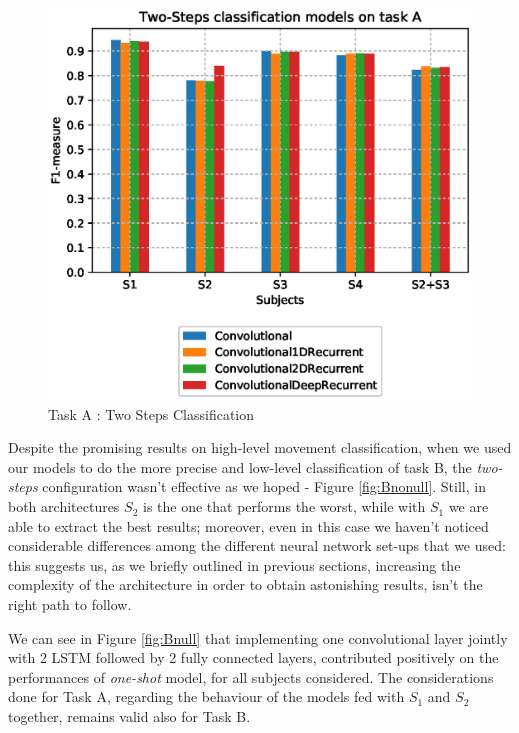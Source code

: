 \begin{figure}[ht]
	\centering
	\includegraphics[scale=.4]{figure/A_models_nonullclass}
	\caption{Task A : Two Steps Classification}
	\label{fig:Anonull}
\end{figure}

Despite the promising results on high-level movement classification, when we used our models to do the more precise and low-level classification of task B, the \textit{two-steps} configuration wasn't effective as we hoped - Figure \ref{fig:Bnonull}. Still, in both architectures $S_2$ is the one that performs the worst, while with $S_1$ we are able to extract the best results; moreover, even in this case we haven't noticed considerable differences among the different neural network set-ups that we used: this suggests us, as we briefly outlined in previous sections, increasing the complexity of the architecture in order to obtain astonishing results, isn't the right path to follow. 

We can see in Figure \ref{fig:Bnull} that implementing one convolutional layer jointly with 2 LSTM followed by 2 fully connected layers, contributed positively on the performances of \textit{one-shot} model, for all subjects considered. The considerations done for Task A, regarding the behaviour of the models fed with $S_1$ and $S_2$ together, remains valid also for Task B. 

